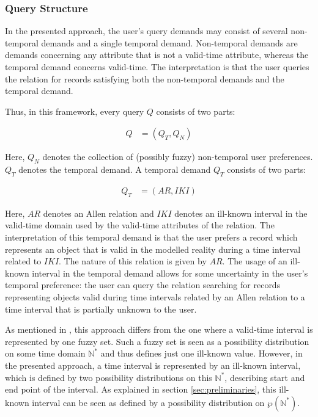 \subsubsection{Query Structure}
In the presented approach, the user's query demands may consist of several non-temporal demands and a single temporal demand. Non-temporal demands are demands concerning any attribute that is not a valid-time attribute, whereas the temporal demand concerns valid-time. The interpretation is that the user queries the relation for records satisfying both the non-temporal demands and the temporal demand.

Thus, in this framework, every query $Q$ consists of two parts: 

\vspace{-10pt}
\begin{align}
Q & = (Q_{T}, Q_{N})
\end{align}

Here, $Q_{N}$ denotes the collection of (possibly fuzzy) non-temporal user preferences. $Q_{T}$ denotes the temporal demand. A temporal demand $Q_{T}$ consists of two parts: 

\vspace{-20pt}
\begin{align}
Q_{T} & = (AR, IKI)
\end{align}

Here, $AR$ denotes an Allen relation \cite{Allen83} and $IKI$ denotes an ill-known interval in the valid-time domain used by the valid-time attributes of the relation. The interpretation of this temporal demand is that the user prefers a record which represents an object that is valid in the modelled reality during a time interval related to $IKI$. The nature of this relation is given by $AR$. The usage of an ill-known interval in the temporal demand allows for some uncertainty in the user's temporal preference: the user can query the relation searching for records representing objects valid during time intervals related by an Allen relation to a time interval that is partially unknown to the user.

As mentioned in \cite{Pon11}, this approach differs from the one where a valid-time interval is represented by one fuzzy set. Such a fuzzy set is seen as a possibility distribution on some time domain $\mathbb{N}^{*}$ and thus defines just one ill-known value. However, in the presented approach, a time interval is represented by an ill-known interval, which is defined by two possibility distributions on this $\mathbb{N}^{*}$, describing start and end point of the interval. As explained in section \ref{sec:preliminaries}, this ill-known interval can be seen as defined by a possibility distribution on $\wp(\mathbb{N}^{*})$. 

